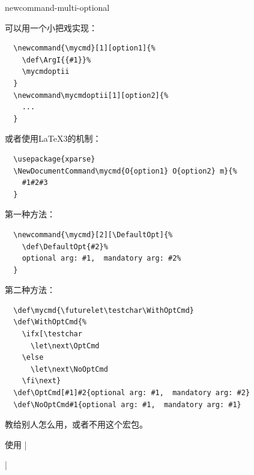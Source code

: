 

{newcommand-multi-optional}

可以用一个小把戏实现：
\begin{verbatim}
  \newcommand{\mycmd}[1][option1]{%
    \def\ArgI{{#1}}%
    \mycmdoptii
  }
  \newcommand\mycmdoptii[1][option2]{%
    ...
  }
\end{verbatim}

或者使用\LaTeX{3}的机制：
\begin{verbatim}
  \usepackage{xparse}
  \NewDocumentCommand\mycmd{O{option1} O{option2} m}{%
    #1#2#3
  }
\end{verbatim}





第一种方法：
\begin{verbatim}
  \newcommand{\mycmd}[2][\DefaultOpt]{%
    \def\DefaultOpt{#2}%
    optional arg: #1,  mandatory arg: #2%
  }
\end{verbatim}

第二种方法：
\begin{verbatim}
  \def\mycmd{\futurelet\testchar\WithOptCmd}
  \def\WithOptCmd{%
    \ifx[\testchar 
      \let\next\OptCmd 
    \else 
      \let\next\NoOptCmd 
    \fi\next}
  \def\OptCmd[#1]#2{optional arg: #1,  mandatory arg: #2}
  \def\NoOptCmd#1{optional arg: #1,  mandatory arg: #1}
\end{verbatim}



教给别人怎么用，或者不用这个宏包。





使用 |\usepackage{indentfirst}|








